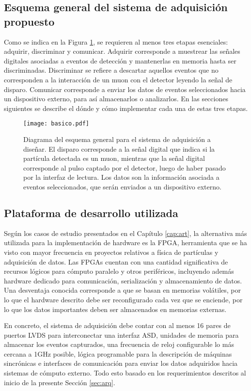 	

	\subsection{Esquema general del sistema de adquisición propuesto}
		Como se indica en la Figura \ref{img:diagrama}, se requieren al menos tres etapas esenciales: adquirir, discriminar y comunicar. Adquirir corresponde a muestrear las señales digitales asociadas a eventos de detección y mantenerlas en memoria hasta ser discriminadas. Discriminar se refiere a descartar aquellos eventos que no corresponden a la interacción de un muon con el detector leyendo la señal de disparo. Comunicar corresponde a enviar los datos de eventos seleccionados hacia un dispositivo externo, para así almacenarlos o analizarlos. En las secciones siguientes se describe el dónde y cómo implementar cada una de estas tres etapas.
		
		\begin{figure}[h]
			\centering
			\texttt{[image: basico.pdf]}
			\caption{Diagrama del esquema general para el sistema de adquisición a diseñar. El disparo corresponde a la señal digital que indica si la partícula detectada es un muon, mientras que la señal digital corresponde al pulso captado por el detector, luego de haber pasado por la interfaz de lectura. Los datos son la información asociada a eventos seleccionados, que serán enviados a un dispositivo externo.}
			\label{img:diagrama}
		\end{figure}
	
	\subsection{Plataforma de desarrollo utilizada}
		Según los casos de estudio presentados en el Capítulo \ref{cap:art}, la alternativa más utilizada para la implementación de hardware es la FPGA, herramienta que se ha visto con mayor frecuencia en proyectos relativos a física de partículas y adquisición de datos. Las FPGAs cuentan con una cantidad significativa de recursos lógicos para cómputo paralelo y otros periféricos, incluyendo además hardware dedicado para comunicación, serialización y almacenamiento de datos. Una desventaja conocida corresponde a que se basan en memorias volátiles, por lo que el hardware descrito debe ser reconfigurado cada vez que se enciende, por lo que los datos importantes deben ser almacenados en memorias externas.
		
		En concreto, el sistema de adquisición debe contar con al menos 16 pares de puertos LVDS para interconectar una interfaz ASD, unidades de memoria para almacenar los eventos capturados, una frecuencia de reloj configurable lo más cercana a 1GHz posible, lógica programable para la descripción de máquinas sincrónicas e interfaces de comunicación para enviar los datos adquiridos hacia sistemas de cómputo externo. Todo esto basado en los requerimientos descritos al inicio de la presente Sección \ref{sec:arq}.
		
